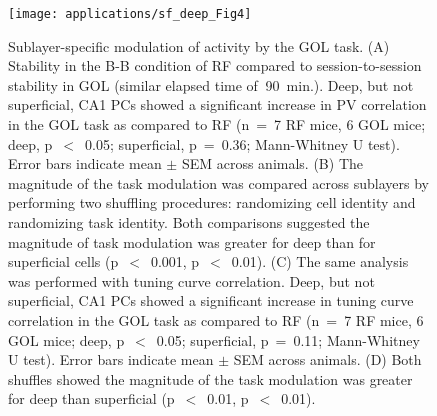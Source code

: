 \begin{figure}
	\centering
	\texttt{[image: applications/sf\_deep\_Fig4]}
	\caption[Sublayer-specific modulation of activity by the GOL task]{Sublayer-specific modulation of activity by the GOL task.
	(A) Stability in the B-B condition of RF compared to session-to-session stability in GOL (similar elapsed time of $~$90~min.). Deep, but not superficial, CA1 PCs showed a significant increase in PV correlation in the GOL task as compared to RF (n~=~7 RF mice, 6 GOL mice; deep, p~$<$~0.05; superficial, p~=~0.36; Mann-Whitney U test). Error bars indicate mean $\pm$ SEM across animals.
	(B) The magnitude of the task modulation was compared across sublayers by performing two shuffling procedures: randomizing cell identity and randomizing task identity. Both comparisons suggested the magnitude of task modulation was greater for deep than for superficial cells (p~$<$~0.001, p~$<$~0.01).
	(C) The same analysis was performed with tuning curve correlation. Deep, but not superficial, CA1 PCs showed a significant increase in tuning curve correlation in the GOL task as compared to RF (n~=~7 RF mice, 6 GOL mice; deep, p~$<$~0.05; superficial, p~=~0.11; Mann-Whitney U test). Error bars indicate mean $\pm$ SEM across animals.
	(D) Both shuffles showed the magnitude of the task modulation was greater for deep than superficial (p~$<$~0.01, p~$<$~0.01).
	}
	\label{fig:other:sf-deep:stability}
\end{figure}

